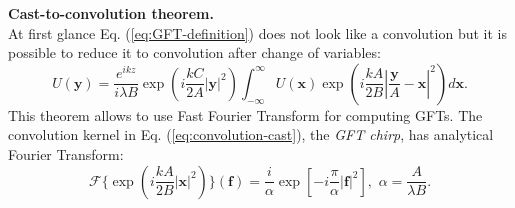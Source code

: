 \textbf{Cast-to-convolution theorem.} \\
At first glance Eq. (\ref{eq:GFT-definition}) does not look like a convolution
but it is possible to reduce it to convolution after change of variables:
\begin{equation} \label{eq:convolution-cast}
  U(\bm{y}) = \frac{e^{ikz}}{i \lambda B}
  \exp \left( i\frac{kC}{2A}|\bm{y}|^{2} \right)
  \int_{-\infty}^{\infty} U(\bm{x})
  \exp \left( i \frac{kA}{2B} |\frac{\bm{y}}{A}-\bm{x}|^{2} \right) d\bm{x}.
\end{equation}
This theorem allows to use Fast Fourier Transform for computing GFTs.
The convolution kernel in Eq. (\ref{eq:convolution-cast}), the \emph{GFT chirp},
 has analytical Fourier Transform:
\begin{equation} \label{eq:GFT-chirp-FT}
  \mathcal{F}
  \{
  \exp \left( i \frac{kA}{2B} |\bm{x}|^{2} \right)
  \} (\bm{f}) =
  \frac{i}{\alpha} \exp \left[ -i \frac{\pi}{\alpha} |\bm{f}|^{2} \right],
  \,\, \alpha = \frac{A}{\lambda B}.
\end{equation}

